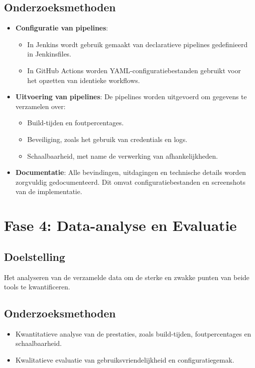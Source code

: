 \subsection*{Onderzoeksmethoden}
\begin{itemize}
    \item \textbf{Configuratie van pipelines}: 
    \begin{itemize}
        \item In Jenkins wordt gebruik gemaakt van declaratieve pipelines gedefinieerd in Jenkinsfiles.
        \item In GitHub Actions worden YAML-configuratiebestanden gebruikt voor het opzetten van identieke workflows.
    \end{itemize}
    \item \textbf{Uitvoering van pipelines}: De pipelines worden uitgevoerd om gegevens te verzamelen over:
    \begin{itemize}
        \item Build-tijden en foutpercentages.
        \item Beveiliging, zoals het gebruik van credentials en logs.
        \item Schaalbaarheid, met name de verwerking van afhankelijkheden.
    \end{itemize}
    \item \textbf{Documentatie}: Alle bevindingen, uitdagingen en technische details worden zorgvuldig gedocumenteerd. Dit omvat configuratiebestanden en screenshots van de implementatie.
\end{itemize}

\section{Fase 4: Data-analyse en Evaluatie}
\subsection*{Doelstelling}
Het analyseren van de verzamelde data om de sterke en zwakke punten van beide tools te kwantificeren.

\subsection*{Onderzoeksmethoden}
\begin{itemize}
    \item Kwantitatieve analyse van de prestaties, zoals build-tijden, foutpercentages en schaalbaarheid.
    \item Kwalitatieve evaluatie van gebruiksvriendelijkheid en configuratiegemak.
\end{itemize}

